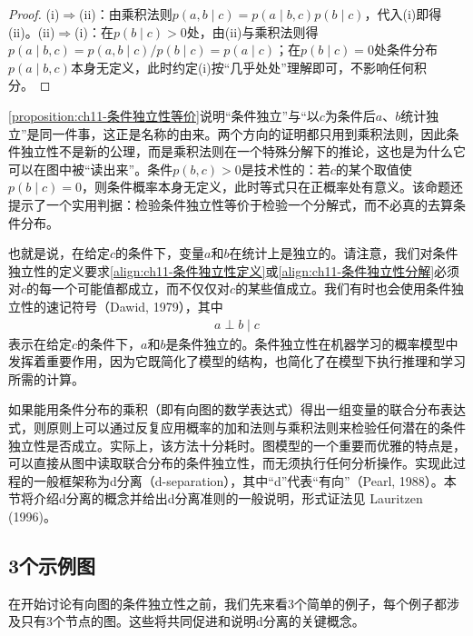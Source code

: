 \documentclass[../../main.tex]{subfiles}
\begin{document}
\begin{proof}
(i)$\Rightarrow$(ii)：由乘积法则$p(a,b\mid c)=p(a\mid b,c)p(b\mid c)$，代入(i)即得(ii)。(ii)$\Rightarrow$(i)：在$p(b\mid c)>0$处，由(ii)与乘积法则得$p(a\mid b,c)=p(a,b\mid c)/p(b\mid c)=p(a\mid c)$；在$p(b\mid c)=0$处条件分布$p(a\mid b,c)$本身无定义，此时约定(i)按“几乎处处”理解即可，不影响任何积分。
\end{proof}

\begin{remark}
\cref{proposition:ch11-条件独立性等价}说明“条件独立”与“以$c$为条件后$a$、$b$统计独立”是同一件事，这正是名称的由来。两个方向的证明都只用到乘积法则，因此条件独立性不是新的公理，而是乘积法则在一个特殊分解下的推论，这也是为什么它可以在图中被“读出来”。条件$p(b,c)>0$是技术性的：若$c$的某个取值使$p(b\mid c)=0$，则条件概率本身无定义，此时等式只在正概率处有意义。该命题还提示了一个实用判据：检验条件独立性等价于检验一个分解式，而不必真的去算条件分布。
\end{remark}

也就是说，在给定$c$的条件下，变量$a$和$b$在统计上是独立的。请注意，我们对条件独立性的定义要求\eqref{align:ch11-条件独立性定义}或\eqref{align:ch11-条件独立性分解}必须对$c$的每一个可能值都成立，而不仅仅对$c$的某些值成立。我们有时也会使用条件独立性的速记符号（Dawid, 1979），其中
\begin{align}
  a \perp b \mid c
  \label{align:ch11-条件独立性记号}
\end{align}
表示在给定$c$的条件下，$a$和$b$是条件独立的。条件独立性在机器学习的概率模型中发挥着重要作用，因为它既简化了模型的结构，也简化了在模型下执行推理和学习所需的计算。

如果能用条件分布的乘积（即有向图的数学表达式）得出一组变量的联合分布表达式，则原则上可以通过反复应用概率的加和法则与乘积法则来检验任何潜在的条件独立性是否成立。实际上，该方法十分耗时。图模型的一个重要而优雅的特点是，可以直接从图中读取联合分布的条件独立性，而无须执行任何分析操作。实现此过程的一般框架称为d分离（d-separation），其中“d”代表“有向”（Pearl, 1988）。本节将介绍d分离的概念并给出d分离准则的一般说明，形式证法见 Lauritzen (1996)。

\subsection{3个示例图}\label{subsection:ch11-3个示例图}

在开始讨论有向图的条件独立性之前，我们先来看3个简单的例子，每个例子都涉及只有3个节点的图。这些将共同促进和说明d分离的关键概念。
\end{document}
